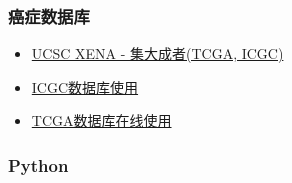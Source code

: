 \documentclass[]{article}
\providecommand{\tightlist}{%
  \setlength{\itemsep}{0pt}\setlength{\parskip}{0pt}}
\numberwithin{figure}{section}
\numberwithin{table}{section}
\begin{document}
\hypertarget{ux764cux75c7ux6570ux636eux5e93}{%
\subsubsection{癌症数据库}\label{ux764cux75c7ux6570ux636eux5e93}}

\begin{itemize}
\tightlist
\item
  \href{http://mp.weixin.qq.com/s?__biz=MzI5MTcwNjA4NQ==\&mid=2247484383\&idx=1\&sn=09c58de206f409fa375fb7af94d0084c\&chksm=ec0dc655db7a4f438cb7e53f281cb5c6bf2484619b3c72d7eafe064ea6a342f69587353531af\#rd}{UCSC XENA - 集大成者(TCGA, ICGC)}
\item
  \href{http://mp.weixin.qq.com/s?__biz=MzI5MTcwNjA4NQ==\&mid=2247484378\&idx=1\&sn=eb6a0f890326898b2fb0867c58f0cf90\&chksm=ec0dc650db7a4f46a0a265ec96b73f367d45f86318087507eef7dde117a369cb7ad427bebb1e\#rd}{ICGC数据库使用}
\item
  \href{http://mp.weixin.qq.com/s?__biz=MzI5MTcwNjA4NQ==\&mid=2247484304\&idx=1\&sn=6ad44dafdc7613e33e13aac48edb32aa\&chksm=ec0dc61adb7a4f0c504f3aeb207132aef479572ea756ce15868cbc57f88e9ea25102752b646a\#rd}{TCGA数据库在线使用}
\end{itemize}

\hypertarget{python}{%
\subsubsection{Python}\label{python}}
\end{document}
